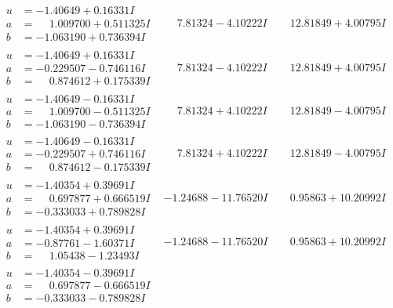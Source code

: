 \documentclass[1p]{elsarticle_modified}
\theoremstyle{definition}
\begin{document}
$$\begin{array}{c|c|c}
\begin{aligned}
u &= -1.40649 + 0.16331 I \\
a &= \phantom{-}1.009700 + 0.511325 I \\
b &= -1.063190 + 0.736394 I\end{aligned}
 & \phantom{-}7.81324 - 4.10222 I & \phantom{-}12.81849 + 4.00795 I \\ \hline\begin{aligned}
u &= -1.40649 + 0.16331 I \\
a &= -0.229507 - 0.746116 I \\
b &= \phantom{-}0.874612 + 0.175339 I\end{aligned}
 & \phantom{-}7.81324 - 4.10222 I & \phantom{-}12.81849 + 4.00795 I \\ \hline\begin{aligned}
u &= -1.40649 - 0.16331 I \\
a &= \phantom{-}1.009700 - 0.511325 I \\
b &= -1.063190 - 0.736394 I\end{aligned}
 & \phantom{-}7.81324 + 4.10222 I & \phantom{-}12.81849 - 4.00795 I \\ \hline\begin{aligned}
u &= -1.40649 - 0.16331 I \\
a &= -0.229507 + 0.746116 I \\
b &= \phantom{-}0.874612 - 0.175339 I\end{aligned}
 & \phantom{-}7.81324 + 4.10222 I & \phantom{-}12.81849 - 4.00795 I \\ \hline\begin{aligned}
u &= -1.40354 + 0.39691 I \\
a &= \phantom{-}0.697877 + 0.666519 I \\
b &= -0.333033 + 0.789828 I\end{aligned}
 & -1.24688 - 11.76520 I & \phantom{-}0.95863 + 10.20992 I \\ \hline\begin{aligned}
u &= -1.40354 + 0.39691 I \\
a &= -0.87761 - 1.60371 I \\
b &= \phantom{-}1.05438 - 1.23493 I\end{aligned}
 & -1.24688 - 11.76520 I & \phantom{-}0.95863 + 10.20992 I \\ \hline\begin{aligned}
u &= -1.40354 - 0.39691 I \\
a &= \phantom{-}0.697877 - 0.666519 I \\
b &= -0.333033 - 0.789828 I\end{aligned}

\end{array}$$
\end{document}
